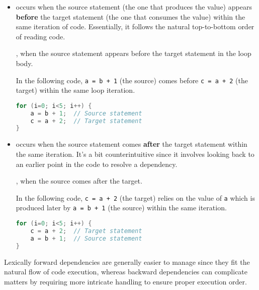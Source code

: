\begin{itemize}
    \item {} occurs when the source statement (the one that produces the value) appears \textbf{before} the target statement (the one that consumes the value) within the same iteration of code. Essentially, it follows the natural top-to-bottom order of reading code.

    \begin{definitionbox}
        , when the source statement appears before the target statement in the loop body.
    \end{definitionbox}
    
    \begin{examplebox}
        In the following code, \texttt{a = b + 1} (the source) comes before \texttt{c = a + 2} (the target) within the same loop iteration.
        \begin{lstlisting}[language=c]
for (i=0; i<5; i++) {
    a = b + 1;  // Source statement
    c = a + 2;  // Target statement
}\end{lstlisting}
    \end{examplebox}

    \item {} occurs when the source statement comes \textbf{after} the target statement within the same iteration. It's a bit counterintuitive since it involves looking back to an earlier point in the code to resolve a dependency.

    \begin{definitionbox}
        , when the source comes after the target.
    \end{definitionbox}

    \begin{examplebox}
        In the following code, \texttt{c = a + 2} (the target) relies on the value of \texttt{a} which is produced later by \texttt{a = b + 1} (the source) within the same iteration.
        \begin{lstlisting}[language=c]
for (i=0; i<5; i++) {
    c = a + 2;  // Target statement
    a = b + 1;  // Source statement
}\end{lstlisting}
    \end{examplebox}
\end{itemize}
Lexically forward dependencies are generally easier to manage since they fit the natural flow of code execution, whereas backward dependencies can complicate matters by requiring more intricate handling to ensure proper execution order.
